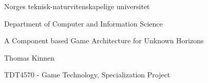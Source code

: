\pagestyle{empty}

\begin{titlepage}
\begin{center}
\begin{LARGE}
Norges teknisk-naturvitenskapelige universitet

Department of Computer and Information Science
\vspace{1.2in}

\end{LARGE}
\begin{Huge}
A Component based Game Architecture for Unknown Horizons\vspace{1.2in}
\vspace{1.7in}


\end{Huge}
\begin{LARGE}
Thomas Kinnen \vspace{0.6in}
\end{LARGE}

\begin{Large}
TDT4570 - Game Technology, Specialization Project
\vspace{1.2in}

\end{Large}
\end{center}

\end{titlepage}
